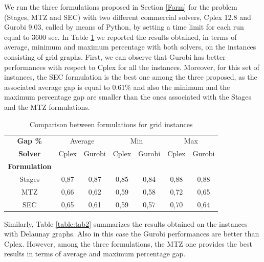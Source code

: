  
\noindent
We run the three formulations proposed in Section \ref{Form} for the \AMD\xspace problem (Stages, MTZ and SEC) with two different commercial solvers, Cplex 12.8 and Gurobi 9.03, called by means of Python, by setting a time limit for each run equal to 3600 sec.
In Table \ref{table:tab1} we reported the results obtained, in terms of average, minimum and maximum percentage with both solvers, on the instances consisting of grid graphs. First, we can observe that Gurobi has better performances with respect to Cplex for all the instances. Moreover, for this set of instances, the SEC formulation is the best one among the three proposed, as the associated average gap is equal to 0.61\% and also the minimum and the maximum percentage gap are smaller than the ones associated with the Stages and the MTZ formulations.\\

 
\renewcommand{\arraystretch}{0.7}
\begin{table}[!h]
\caption{Comparison between formulations for grid instances}
\centering
\footnotesize
\begin{tabular}{c | c c | c c | c c}
\hline\hline
\textbf{Gap \%} & \multicolumn{2}{c}{Average} &  \multicolumn{2}{c}{Min} &  \multicolumn{2}{c}{Max} \\
\textbf{Solver} &Cplex &Gurobi &Cplex &Gurobi  &Cplex &Gurobi \\
\hline
\textbf{Formulation} & & & & & &\\
Stages & 0,87 &	0,87 &	0,85 &	0,84 &	0,88 &	0,88\\
MTZ	 & 0,66 &	0,62 &	0,59 &	0,58 &	0,72 &	0,65\\
SEC	& 0,65 &	0,61 &	0,59 &	0,57 &	0,70 &	0,64\\
    \hline
\end{tabular}
\label{table:tab1}
\end{table}


\noindent
Similarly, Table \ref{table:tab2} summarizes the results obtained on the instances with Delaunay graphs. Also in this case the Gurobi performances are better than Cplex. However, among the three formulations, the MTZ one provides the best results in terms of average and maximum percentage gap.



